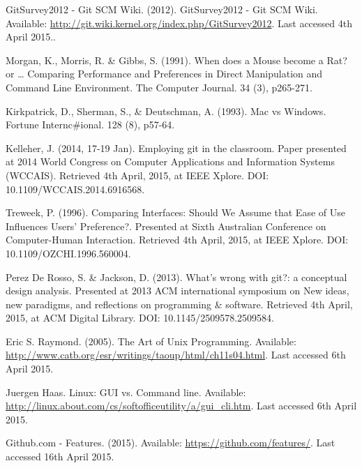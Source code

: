 \documentclass[12pt,a4paper,article,compsoc]{IEEEtran}
\begin{document}
		\newpage
		\begin{thebibliography}{1}
			
			GitSurvey2012 - Git SCM Wiki. (2012). GitSurvey2012 - Git SCM Wiki. Available: \url{http://git.wiki.kernel.org/index.php/GitSurvey2012}. Last accessed 4th April 2015..
			
			Morgan, K., Morris, R. \& Gibbs, S. (1991). When does a Mouse become a Rat? or … Comparing Performance and Preferences in Direct Manipulation and Command Line Environment. The Computer Journal. 34 (3), p265-271.
			
			Kirkpatrick, D., Sherman, S., \& Deutschman, A. (1993). Mac vs Windows. Fortune Internc\#ional. 128 (8), p57-64.
			
			Kelleher, J. (2014, 17-19 Jan). Employing git in the classroom. Paper presented at 2014 World Congress on Computer Applications and Information Systems (WCCAIS). Retrieved 4th April, 2015, at IEEE Xplore. DOI: 10.1109/WCCAIS.2014.6916568.
			
			Treweek, P. (1996). Comparing Interfaces: Should We Assume that Ease of Use Influences Users' Preference?. Presented at Sixth Australian Conference on Computer-Human Interaction. Retrieved 4th April, 2015, at IEEE Xplore. DOI: 10.1109/OZCHI.1996.560004.
			
			
			Perez De Rosso, S. \& Jackson, D. (2013). What's wrong with git?: a conceptual design analysis. Presented at 2013 ACM international symposium on New ideas, new paradigms, and reflections on programming \& software. Retrieved 4th April, 2015, at ACM Digital Library. DOI: 10.1145/2509578.2509584.
			
			Eric S. Raymond. (2005). The Art of Unix Programming.
			Available: \url{http://www.catb.org/esr/writings/taoup/html/ch11s04.html}.
			Last accessed 6th April 2015.
			
			Juergen Haas. Linux: GUI vs. Command line. Available: \url{http://linux.about.com/cs/softofficeutility/a/gui\_cli.htm}. Last accessed 6th April 2015.
			
			Github.com - Features. (2015). Available: \url{https://github.com/features/}. Last accessed 16th April 2015.
			

\end{thebibliography}
\end{document}
